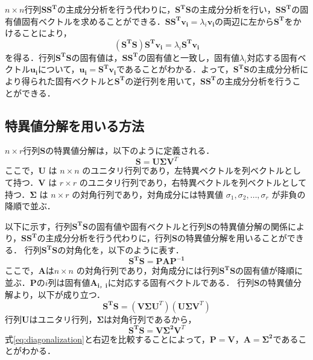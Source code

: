 \documentclass[a4j,12pt]{jreport}
\begin{document}
$n \times n$行列$\bm{S}\bm{S^T}$の主成分分析を行う代わりに，$\bm{S^T}\bm{S}$の主成分分析を行い，$\bm{S}\bm{S^T}$の固有値固有ベクトルを求めることができる．$\bm{S}\bm{S^T}\bm{v_i} = \lambda_i\bm{v_i}$の両辺に左から$\bm{S^T}$をかけることにより，
\[
	(\bm{S^T}\bm{S})\bm{S^T}\bm{v_i} = \lambda_i\bm{S^T}\bm{v_i}
\]
を得る．行列$\bm{S^T}\bm{S}$の固有値は，$\bm{S}\bm{S^T}$の固有値と一致し，固有値$\lambda_i$対応する固有ベクトル$\bm{u_i}$について，$\bm{u_i} = \bm{S^T}\bm{v_i}$であることがわかる．よって，$\bm{S^T}\bm{S}$の主成分分析により得られた固有ベクトルと$\bm{S^T}$の逆行列を用いて，$\bm{S}\bm{S^T}$の主成分分析を行うことができる．

\subsection{特異値分解を用いる方法}
$n \times r$行列$\bm{S}$の特異値分解は，以下のように定義される．
\[
\bm{S} = \bm{U} \bm{\Sigma} \bm{V}^T
\]
ここで，\( \bm{U} \) は \( n \times n \) のユニタリ行列であり，左特異ベクトルを列ベクトルとして持つ．\( \bm{V} \) は \( r \times r \) のユニタリ行列であり，右特異ベクトルを列ベクトルとして持つ．\(\bm{ \Sigma }\) は \( n \times r \) の対角行列であり，対角成分には特異値 \( \sigma_1, \sigma_2, \dots, \sigma_r \) が非負の降順で並ぶ．

以下に示す，行列$\bm{S^T}\bm{S}$の固有値や固有ベクトルと行列$\bm{S}$の特異値分解の関係により，$\bm{S}\bm{S^T}$の主成分分析を行う代わりに，行列\(\bm{S}\)の特異値分解を用いることができる．
行列$\bm{S^T}\bm{S}$の対角化を，以下のように表す．
\begin{equation}\label{eq:diagonalization}
	\bm{S^T}\bm{S} = \bm{P}\bm{A}\bm{P^{-1}}
\end{equation}
ここで，\(\bm{A}\)は\( n \times n \) の対角行列であり，対角成分には行列$\bm{S^T}\bm{S}$の固有値が降順に並ぶ．\(\bm{P}\)の\(i\)列は固有値\(\bm{A_{i，i}}\)に対応する固有ベクトルである．
行列\(\bm{S}\)の特異値分解より，以下が成り立つ．
\[
\bm{S^T}\bm{S} = (\bm{V} \bm{\Sigma} \bm{U}^T)(\bm{U} \bm{\Sigma} \bm{V}^T)
\]
行列\(\bm{U}\)はユニタリ行列，\(\bm{\Sigma}\)は対角行列であるから，
\[
\bm{S^T}\bm{S} = \bm{V}\bm{\Sigma^2} \bm{V}^T
\]
式\ref{eq:diagonalization}と右辺を比較することによって，\(\bm{P} = \bm{V} \)，\(\bm{A} = \bm{\Sigma^2} \)であることがわかる．
\end{document}
